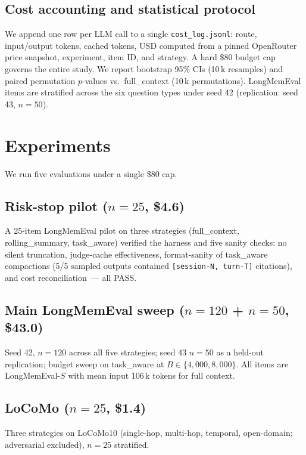 \documentclass{article}
\begin{document}
\subsection{Cost accounting and statistical protocol}

We append one row per LLM call to a single \texttt{cost\_log.jsonl}: route,
input/output tokens, cached tokens, USD computed from a pinned OpenRouter
price snapshot, experiment, item ID, and strategy. A hard \$80 budget cap
governs the entire study. We report bootstrap 95\% CIs (10\,k resamples)
and paired permutation $p$-values vs.\ \textsf{full\_context} (10\,k
permutations). LongMemEval items are stratified across the six
question types under seed 42 (replication: seed 43, $n{=}50$).

\section{Experiments}\label{sec:experiments}

We run five evaluations under a single \$80 cap.

\subsection{Risk-stop pilot ($n{=}25$, \$4.6)}

A 25-item LongMemEval pilot on three strategies
(\textsf{full\_context}, \textsf{rolling\_summary},
\textsf{task\_aware}) verified the harness and five sanity checks: no
silent truncation, judge-cache effectiveness, format-sanity of
\textsf{task\_aware} compactions
(5/5 sampled outputs contained \verb|[session-N, turn-T]| citations),
and cost reconciliation~--- all PASS.

\subsection{Main LongMemEval sweep ($n{=}120$ + $n{=}50$, \$43.0)}

Seed 42, $n{=}120$ across all five strategies; seed 43 $n{=}50$ as a
held-out replication; budget sweep on \textsf{task\_aware} at
$B \in \{4{,}000, 8{,}000\}$. All items are LongMemEval-$S$ with mean
input 106\,k tokens for full context.

\subsection{LoCoMo ($n{=}25$, \$1.4)}

Three strategies on LoCoMo10 (single-hop, multi-hop, temporal,
open-domain; adversarial excluded), $n{=}25$ stratified.
\end{document}
